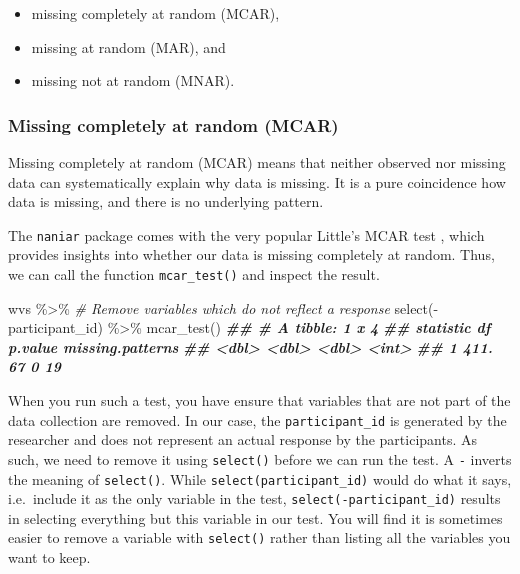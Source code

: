 \documentclass[
]{book}
\newenvironment{Shaded}{\begin{snugshade}}{\end{snugshade}}
\newcommand{\CommentTok}[1]{\textcolor[rgb]{0.56,0.35,0.01}{\textit{#1}}}
\newcommand{\DocumentationTok}[1]{\textcolor[rgb]{0.56,0.35,0.01}{\textbf{\textit{#1}}}}
\newcommand{\FunctionTok}[1]{\textcolor[rgb]{0.00,0.00,0.00}{#1}}
\newcommand{\NormalTok}[1]{#1}
\newcommand{\SpecialCharTok}[1]{\textcolor[rgb]{0.00,0.00,0.00}{#1}}
\begin{document}
\begin{itemize}
\item
  missing completely at random (MCAR),
\item
  missing at random (MAR), and
\item
  missing not at random (MNAR). \citep{rubin-1976}
\end{itemize}

\hypertarget{missing-completetly-at-random-mcar}{%
\subsubsection{Missing completely at random (MCAR)}\label{missing-completetly-at-random-mcar}}

Missing completely at random (MCAR) means that neither observed nor missing data can systematically explain why data is missing. It is a pure coincidence how data is missing, and there is no underlying pattern.

The \texttt{naniar} package comes with the very popular Little's MCAR test \citep{little-1988}, which provides insights into whether our data is missing completely at random. Thus, we can call the function \texttt{mcar\_test()} and inspect the result.

\begin{Shaded}
\begin{Highlighting}[]
\NormalTok{wvs }\SpecialCharTok{\%\textgreater{}\%}
  \CommentTok{\# Remove variables which do not reflect a response}
  \FunctionTok{select}\NormalTok{(}\SpecialCharTok{{-}}\NormalTok{participant\_id) }\SpecialCharTok{\%\textgreater{}\%}
  \FunctionTok{mcar\_test}\NormalTok{()}
\DocumentationTok{\#\# \# A tibble: 1 x 4}
\DocumentationTok{\#\#   statistic    df p.value missing.patterns}
\DocumentationTok{\#\#       \textless{}dbl\textgreater{} \textless{}dbl\textgreater{}   \textless{}dbl\textgreater{}            \textless{}int\textgreater{}}
\DocumentationTok{\#\# 1      411.    67       0               19}
\end{Highlighting}
\end{Shaded}

When you run such a test, you have ensure that variables that are not part of the data collection are removed. In our case, the \texttt{participant\_id} is generated by the researcher and does not represent an actual response by the participants. As such, we need to remove it using \texttt{select()} before we can run the test. A \texttt{-} inverts the meaning of \texttt{select()}. While \texttt{select(participant\_id)} would do what it says, i.e.~include it as the only variable in the test, \texttt{select(-participant\_id)} results in selecting everything but this variable in our test. You will find it is sometimes easier to remove a variable with \texttt{select()} rather than listing all the variables you want to keep.
\end{document}
